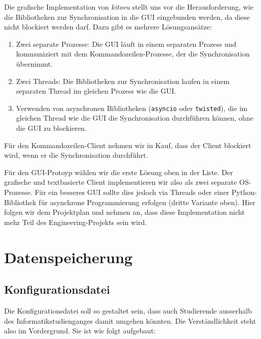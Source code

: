 \documentclass[a4paper]{article}
\let\oldsection\section
\renewcommand\section{\clearpage\oldsection}
\begin{document}

Die grafische Implementation von \emph{kitovu} stellt uns vor die Herausforderung, wie die Bibliotheken zur Synchronisation in die GUI eingebunden werden, da diese nicht blockiert werden darf. Dazu gibt es mehrere Lösungsansätze:

\begin{enumerate}
	\item Zwei separate Prozesse: Die GUI läuft in einem separaten Prozess und kommuniziert mit dem Kommandozeilen-Prozesse, der die Synchronisation übernimmt.
	\item Zwei Threads: Die Bibliotheken zur Synchronisation laufen in einem separaten Thread im gleichen Prozess wie die GUI.
	\item Verwenden von asynchronen Bibliotheken (\verb|asyncio| oder \verb|twisted|), die im gleichen Thread wie die GUI die Synchronisation durchführen können, ohne die GUI zu blockieren.
\end{enumerate}

Für den Kommandozeilen-Client nehmen wir in Kauf, dass der Client blockiert wird, wenn er die Synchronisation durchführt.

Für den GUI-Protoyp wählen wir die erste Lösung oben in der Liste. Der grafische und textbasierte Client implementieren wir also als zwei separate OS-Prozesse. Für ein besseres GUI sollte dies jedoch via Threads oder einer Python-Bibliothek für asynchrone Programmierung erfolgen (dritte Variante oben). Hier folgen wir dem Projektplan und nehmen an, dass diese Implementation nicht mehr Teil des Engineering-Projekts sein wird.

\section{Datenspeicherung}

\subsection{Konfigurationsdatei}
Die Konfigurationsdatei soll so gestaltet sein, dass auch Studierende ausserhalb des Informatikstudienganges damit umgehen könnten. Die Verständlichkeit steht also im Vordergrund. Sie ist wie folgt aufgebaut:
\end{document}
